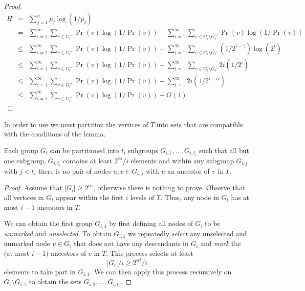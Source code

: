 \documentclass[charterfonts,lotsofwhite]{patmorin}
\begin{document}
\begin{proof}
\begin{eqnarray*}
   H & = & \sum_{j=1}^n p_j\log(1/p_j) \\
   & = & \sum_{i=1}^{\infty}\sum_{v\in G_i'} \Pr(v)\log (1/\Pr(v)) +
         \sum_{i=1}^{\infty}\sum_{v\in G_i\setminus G_i'} \Pr(v)\log (1/\Pr(v)) \\
   & \le & \sum_{i=1}^{\infty}\sum_{v\in G_i'} \Pr(v)\log (1/\Pr(v)) +
         \sum_{i=1}^{\infty}\sum_{v\in G_i\setminus G_i'} (1/2^{i-1})\log (2^i) \\
   & \le & \sum_{i=1}^{\infty}\sum_{v\in G_i'} \Pr(v)\log (1/\Pr(v)) +
         \sum_{i=1}^{\infty}\sum_{v\in G_i\setminus G_i'} 2i(1/2^{i}) \\
   & \le & \sum_{i=1}^{\infty}\sum_{v\in G_i'} \Pr(v)\log (1/\Pr(v)) +
         \sum_{i=1}^{\infty} 2i(1/2^{i-\alpha}) \\
   & \le & \sum_{i=1}^{\infty}\sum_{v\in G_i'} \Pr(v)\log (1/\Pr(v)) + O(1)
\end{eqnarray*}
\end{proof}

In order to use  we must partition the vertices of
$T$ into sets that are compatible with the conditions of the lemma.

\begin{lem}
Each group $G_i$ can be partitioned into $t_i$ subgroups
$G_{i,1},\ldots,G_{i,t_i}$ such that all but one subgroup, $G_{i,t_i}$
contains at least $2^{\alpha i}/i$ elements and within any subgroup
$G_{i,j}$ with $j < t_i$ there is no pair of nodes $u,v\in G_{i,j}$
with $u$ an ancestor of $v$ in $T$.
\end{lem}

\begin{proof}
Assume that $|G_i|\ge 2^{\alpha i}$, otherwise there is nothing to
prove.  Observe that all vertices in $G_i$ appear within the first $i$
levels of $T$.  Thus, any node in $G_i$ has at most $i-1$ ancestors in
$T$.  

We can obtain the first group $G_{i,1}$ by first defining all nodes of
$G_i$ to be \emph{unmarked} and \emph{unselected}.  To obtain
$G_{i,1}$ we repeatedly \emph{select} any unselected and unmarked
node $v\in G_i$ that does not have any descendants in $G_i$ and
\emph{mark} the (at most $i-1$) ancestors of $v$ in $T$.  This
process selects at least
\[
   |G_i|/i \ge 2^{\alpha i}/i
\] 
elements to take part in $G_{i,1}$.  We can then apply this process
recursively on $G_i\setminus G_{i,1}$ to obtain the sets
$G_{i,2},\ldots,G_{i,t_i}$.
\end{proof}
\end{document}
